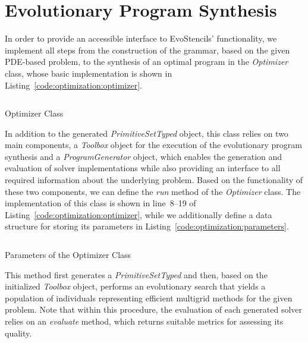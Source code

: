 \section{Evolutionary Program Synthesis}
\label{sec:evostencils-part1:evolutionary-program-synthesis}
In order to provide an accessible interface to EvoStencils' functionality, we implement all steps from the construction of the grammar, based on the given PDE-based problem, to the synthesis of an optimal program in the \emph{Optimizer} class, whose basic implementation is shown in Listing~\ref{code:optimization:optimizer}.
\begin{listing}
    \inputminted[linenos]{python}{evostencils/optimization/optimizer.py}
	\caption{Optimizer Class}
	\label{code:optimization:optimizer}
\end{listing}
In addition to the generated \emph{PrimitiveSetTyped} object, this class relies on two main components, a \emph{Toolbox} object for the execution of the evolutionary program synthesis and a \emph{ProgramGenerator} object, which enables the generation and evaluation of solver implementations while also providing an interface to all required information about the underlying problem.
Based on the functionality of these two components, we can define the \emph{run} method of the \emph{Optimizer} class.
The implementation of this class is shown in line~8--19 of Listing~\ref{code:optimization:optimizer}, while we additionally define a data structure for storing its parameters in Listing~\ref{code:optimization:parameters}.
\begin{listing}
    \inputminted{python}{evostencils/optimization/parameters.py}
	\caption{Parameters of the Optimizer Class}
	\label{code:optimization:parameters}
\end{listing}
This method first generates a \emph{PrimitiveSetTyped} and then, based on the initialized \emph{Toolbox} object, performs an evolutionary search that yields a population of individuals representing efficient multigrid methods for the given problem.
Note that within this procedure, the evaluation of each generated solver relies on an \emph{evaluate} method, which returns suitable metrics for assessing its quality.

